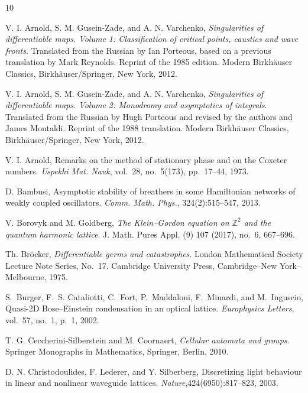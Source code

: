 \documentclass[12pt]{amsart}
\begin{document}
	\begin{thebibliography}{10}
		
		 V. I. Arnold, S. M. Gusein-Zade, and A. N. Varchenko, \emph{Singularities of differentiable maps. Volume 1: Classification of critical points, caustics and wave fronts}. Translated from the Russian by Ian Porteous, based on a previous translation by Mark Reynolds. Reprint of the 1985 edition. Modern Birkhäuser Classics, Birkhäuser/Springer, New York, 2012.
		
		 V. I. Arnold, S. M. Gusein-Zade, and A. N. Varchenko, \emph{Singularities of differentiable maps. Volume 2: Monodromy and asymptotics of integrals}. Translated from the Russian by Hugh Porteous and revised by the authors and James Montaldi. Reprint of the 1988 translation. Modern Birkhäuser Classics, Birkhäuser/Springer, New York, 2012.
		
		 V. I. Arnold, Remarks on the method of stationary phase and on the Coxeter numbers. \emph{Uspekhi Mat. Nauk}, vol.~28, no.~5(173), pp.~17--44, 1973.

 D. Bambusi, Asymptotic stability of breathers in some Hamiltonian networks of weakly coupled oscillators. \emph{Comm. Math. Phys.}, 324(2):515--547, 2013.

        V. Borovyk and M. Goldberg, \emph{The Klein--Gordon equation on $\mathbb{Z}^2$ and the quantum harmonic lattice}.
        J. Math. Pures Appl. (9) 107 (2017), no.~6, 667--696.



		
		
		 Th. Bröcker, \emph{Differentiable germs and catastrophes}. London Mathematical Society Lecture Note Series, No.~17. Cambridge University Press, Cambridge--New York--Melbourne, 1975.

S.~Burger, F.~S. Cataliotti, C.~Fort, P.~Maddaloni, F.~Minardi, and M.~Inguscio, Quasi-2D Bose--Einstein condensation in an optical lattice.
\emph{Europhysics Letters}, vol.~57, no.~1, p.~1, 2002.

		T. G. Ceccherini-Silberstein and M. Coornaert, \emph{Cellular automata and groups}. Springer Monographs in Mathematics, Springer, Berlin, 2010.

		D. N. Christodoulides, F. Lederer, and Y. Silberberg, Discretizing light behaviour in linear and nonlinear waveguide lattices. \emph{Nature},424(6950):817--823, 2003.


\end{thebibliography}
\end{document}
